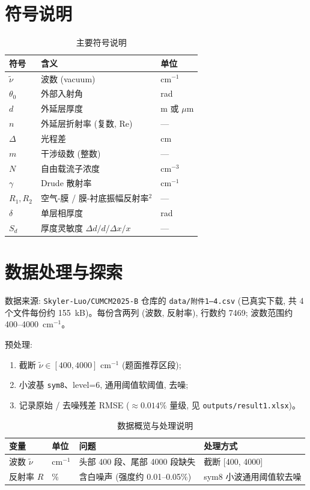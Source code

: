 \documentclass[UTF8,a4paper,12pt]{ctexart}
\begin{document}
\section{符号说明}
\begin{table}[H]
\centering
\caption{主要符号说明}
\label{tab:notation}
\begin{tabular}{lll}
\toprule
符号 & 含义 & 单位 \\
\midrule
$\tilde{\nu}$ & 波数 (vacuum) & cm$^{-1}$ \\
$\theta_0$ & 外部入射角 & rad \\
$d$ & 外延层厚度 & m 或 $\mu$m \\
$n$ & 外延层折射率 (复数, Re) & --- \\
$\Delta$ & 光程差 & cm \\
$m$ & 干涉级数 (整数) & --- \\
$N$ & 自由载流子浓度 & cm$^{-3}$ \\
$\gamma$ & Drude 散射率 & cm$^{-1}$ \\
$R_1, R_2$ & 空气-膜 / 膜-衬底振幅反射率$^2$ & --- \\
$\delta$ & 单层相厚度 & rad \\
\addlinespace
$S_d$ & 厚度灵敏度 $\Delta d/d / \Delta x / x$ & --- \\
\bottomrule
\end{tabular}
\end{table}

\section{数据处理与探索}
数据来源: \texttt{Skyler-Luo/CUMCM2025-B} 仓库的 \texttt{data/附件1--4.csv} (已真实下载, 共 4 个文件每份约 155~kB)。每份含两列 (波数, 反射率), 行数约 7469; 波数范围约 400--4000~cm$^{-1}$。

预处理:
\begin{enumerate}
\item 截断 $\tilde{\nu}\in[400, 4000]$ cm$^{-1}$ (题面推荐区段);
\item 小波基 \texttt{sym8}、level=6, 通用阈值软阈值, 去噪;
\item 记录原始 / 去噪残差 RMSE ($\approx 0.014\%$ 量级, 见 \texttt{outputs/result1.xlsx})。
\end{enumerate}

\begin{table}[H]
\centering
\caption{数据概览与处理说明}
\label{tab:data-overview}
\begin{tabular}{llll}
\toprule
变量 & 单位 & 问题 & 处理方式 \\
\midrule
波数 $\tilde{\nu}$ & cm$^{-1}$ & 头部 400 段、尾部 4000 段缺失 & 截断 [400, 4000] \\
反射率 $R$ & \% & 含白噪声 (强度约 0.01--0.05\%) & sym8 小波通用阈值软去噪 \\
\bottomrule
\end{tabular}
\end{table}
\end{document}
